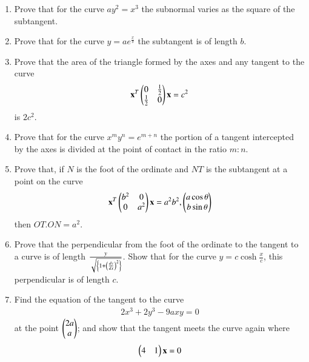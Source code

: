 \begin{enumerate}[label=\arabic*.,ref=\thesubsection.\theenumi]
\item Prove that for the curve $ay^2=x^3$ the subnormal varies as the square of the subtangent.
\item Prove that for the curve $y=ae^{\frac{x}{b}}$ the subtangent is of length $b$.
\item Prove that the area of the triangle formed by the axes and any tangent to the curve 
 \begin{align}
\mathbf{x}^T\begin{pmatrix}0 & \frac{1}{2}\\ \frac{1}{2} & 0\end{pmatrix}\mathbf{x}=c^2
\end{align}
is $2c^2$.
\item Prove that for the curve $x^my^n=e^{m+n}$ the portion of a tangent intercepted by the axes is divided at the point of contact in the ratio $m:n$.
\item Prove that, if $N$ is the foot of the ordinate and $NT$ is the subtangent at a point on the
curve 
\begin{align}
\mathbf{x}^T\begin{pmatrix}b^2 & 0\\0 & a^2\end{pmatrix}\mathbf{x}=a^2b^2, \begin{pmatrix}a\cos\theta\\b\sin\theta\end{pmatrix}
\end{align}
 then $OT.ON=a^2$.
\item Prove that the perpendicular from the foot of the ordinate to the tangent to a curve is of length
$\frac{y}{\sqrt{\left\{1+\left(\frac{dy}{dx}\right)^2\right\}}}$.  Show that for the curve $y = c\cosh \frac{x}{c}$, this perpendicular is of length $c$.
\item Find the equation of the tangent to the curve 
\begin{align}
2x^3+2y^3 - 9axy = 0
\end{align}
at the point $\begin{pmatrix}2a\\a\end{pmatrix}$; and show that the tangent meets the curve again where 
\begin{align}
\begin{pmatrix}4 & 1\end{pmatrix}\mathbf{x} = 0
\end{align}
\end{enumerate}
